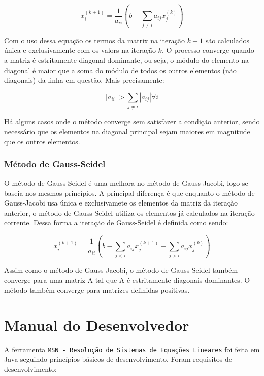 \documentclass[a4paper,10pt]{report}
\newcommand{\ferramenta}{\texttt{MSN - Resolução de Sistemas de Equações Lineares}\xspace}
\begin{document}
\begin{equation*}
 x^{(k+1)}_{i}=\dfrac{1}{a_{ii}}(b-\sum_{j \neq i} a_{ij}x^{(k)}_{j})
\end{equation*}

Com o uso dessa equação os termos da matrix na iteração $k+1$ são calculados única e exclusivamente com os valors na iteração $k$. O processo converge quando a matriz é estritamente diagonal dominante, ou seja, o módulo do elemento na diagonal é maior que a soma do módulo de todos os outros elementos (não diagonais) da linha em questão. Mais precisamente:

\begin{equation*}
|a_{ii}| > \sum_{j \neq i}|a_{ij}| \forall i
\end{equation*}

Há alguns casos onde o método converge sem satisfazer a condição anterior, sendo necessário que os elementos na diagonal principal sejam maiores em magnitude que os outros elementos.

\subsection{Método de Gauss-Seidel}

O método de Gauss-Seidel é uma melhora no método de Gauss-Jacobi, logo se baseia nos mesmos princípios. A principal diferença é que enquanto o método de Gauss-Jacobi usa única e exclusivamete os elementos da matriz da iteraçào anterior, o método de Gauss-Seidel utiliza os elementos já calculados na iteração corrente. Dessa forma a iteração de Gauss-Seidel é definida como sendo:

\begin{equation*}
 x^{(k+1)}_{i}=\dfrac{1}{a_{ii}}(b-\sum_{j < i} a_{ij}x^{(k+1)}_{j}-\sum_{j > i} a_{ij}x^{(k)}_{j})
\end{equation*}

Assim como o método de Gauss-Jacobi, o método de Gauss-Seidel também converge para uma matriz A tal que A é estritamente diagonais dominantes. O método também converge para matrizes definidas positivas.

\chapter{Manual do Desenvolvedor}
\label{desenvolvedor}

A ferramenta \ferramenta foi feita em Java seguindo princípios básicos de desenvolvimento. Foram requisitos de desenvolvimento:
\end{document}
